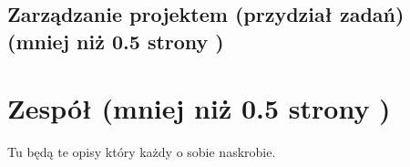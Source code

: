 			
\subsection{Zarządzanie projektem (przydział zadań) (mniej niż 0.5 strony )}
	
	
	
\section{Zespół (mniej niż 0.5 strony )}
	Tu będą te opisy który każdy o sobie naskrobie.
	
	
	
	
	
	
	
